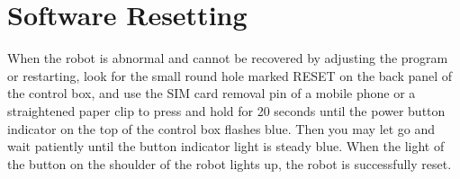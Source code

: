 \chapter{Software Resetting}

When the robot is abnormal and cannot be recovered by adjusting the program or restarting, look for the small round hole marked {\sf RESET} on the back panel of the control box, and use the SIM card removal pin of a mobile phone or a straightened paper clip to press and hold for 20 seconds until the power button indicator on the top of the control box flashes blue. Then you may let go and wait patiently until the button indicator light is steady blue. When the light of the button on the shoulder of the robot lights up, the robot is successfully reset.

